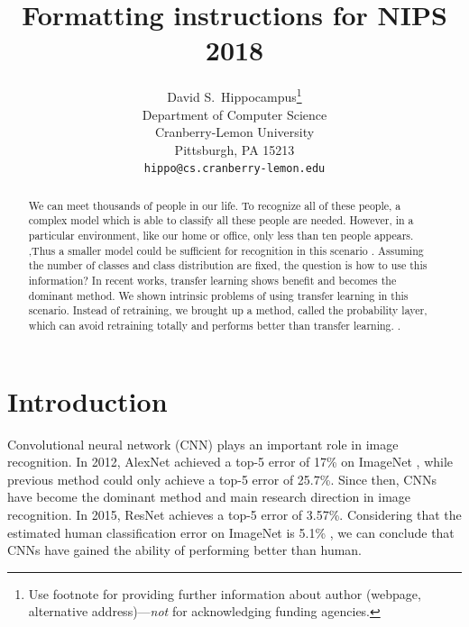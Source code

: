 \documentclass{article}
\title{Formatting instructions for NIPS 2018}
\author{
  David S.~Hippocampus\thanks{Use footnote for providing further
    information about author (webpage, alternative
    address)---\emph{not} for acknowledging funding agencies.} \\
  Department of Computer Science\\
  Cranberry-Lemon University\\
  Pittsburgh, PA 15213 \\
  \texttt{hippo@cs.cranberry-lemon.edu} \\
}
\begin{document}

\maketitle


\begin{abstract}
  We can meet thousands of people in our life. To recognize all of these people, a complex model which is able to classify all these people are needed. However, in a particular environment, like our home or office, only less than ten people appears. ,Thus a smaller model could be sufficient for recognition in this scenario   . Assuming the number of classes and class distribution are fixed, the question is how to use this information?   In recent works, transfer learning shows benefit and becomes the dominant method. We shown intrinsic problems of using transfer learning in this scenario. Instead of retraining, we brought up a method, called the probability layer, which can avoid retraining totally and performs better than transfer learning.   .
\end{abstract}


\section{Introduction}
Convolutional neural network (CNN) plays an important role in image recognition. In 2012, AlexNet \cite{krizhevsky2012imagenet} achieved a top-5 error of 17\% on ImageNet \cite{deng2009imagenet}, while previous method could only achieve a top-5 error of 25.7\%. Since then, CNNs have become the dominant method and main research direction in image recognition. In 2015, ResNet \cite{he2016deep} achieves a top-5 error of 3.57\%. Considering that the estimated human classification error on ImageNet is 5.1\% \cite{russakovsky2015imagenet}, we can conclude that CNNs have gained the ability of performing better than human. 
\end{document}
